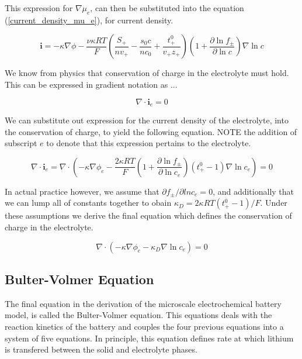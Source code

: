 \documentclass[lettersize,journal]{IEEEtran}
\begin{document}
\noindent This expression for $\nabla \mu_e$, can then be substituted into the equation (\ref{current_density_mu_e}), for current density.

\begin{equation}
\mathbf{i}=-\kappa \nabla \phi-\frac{\nu \kappa R T}{F}\left(\frac{S_{+}}{n v_{+}}-\frac{s_{0} c}{n c_{0}}+\frac{t_{+}^{0}}{v_{+} z_{+}}\right)\left(1+\frac{\partial \ln f_{\pm}}{\partial \ln c}\right) \nabla \ln c
\end{equation}

\noindent We know from physics that conservation of charge in the electrolyte must hold. This can be expressed in gradient notation as ...

\begin{equation}
  \nabla \cdot \mathbf{i}_e = 0
\end{equation}

\noindent We can substitute out expression for the current density of the electrolyte, into the conservation of charge, to yield the following equation. NOTE the addition of subscript $e$ to denote that this expression pertains to the electrolyte.

\begin{equation}
\nabla \cdot \mathbf{i}_{e}=\nabla \cdot\left(-\kappa \nabla \phi_{e}-\frac{2 \kappa R T}{F}\left(1+\frac{\partial \ln f_{\pm}}{\partial \ln c_{e}}\right)\left(t_{+}^{0}-1\right) \nabla \ln c_{e}\right)=0
\end{equation}

\noindent In actual practice however, we assume that $\partial{f_{\pm}}/\partial ln {c_e} = 0 $, and additionally that we can lump all of constants together to obain $\kappa_{D}=2 \kappa R T\left(t_{+}^{0}-1\right) / F$. Under these assumptions we derive the final equation which defines the conservation of charge in the electrolyte.

\begin{equation}
\nabla \cdot\left(-\kappa \nabla \phi_{e}-\kappa_{D} \nabla \ln c_{e}\right)=0
\end{equation}


\subsection{Bulter-Volmer Equation}
The final equation in the derivation of the microscale electrochemical battery model, is called the Bulter-Volmer equation. This equations deals with the reaction kinetics of the battery and couples the four previous equations into a system of five equations. In principle, this equation defines rate at which lithium is transfered between the solid and electrolyte phases.
\end{document}
